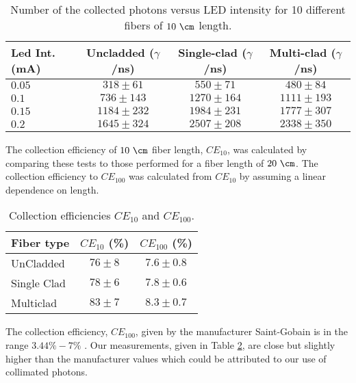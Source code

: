 \begin{table}[htbp]
\centering{}%
\begin{tabular}{lccc}
\toprule 
Led Int. (mA) & Uncladded ($\gamma$/ns) & Single-clad ($\gamma$/ns) & Multi-clad ($\gamma$/ns) \tabularnewline
\midrule
\midrule 
$0.05$ & $318 \pm 61$ & $550 \pm 71$ & $480 \pm 84$ \tabularnewline
$0.1$ & $736 \pm 143$ & $1270 \pm 164$ & $1111 \pm 193$ \tabularnewline
$0.15$ & $1184 \pm 232$ & $1984 \pm 231$ & $1777\pm 307$ \tabularnewline
$0.2$ & $1645 \pm 324$ & $2507 \pm 208$ & $2338 \pm 350$ \tabularnewline
\bottomrule
\end{tabular}
\caption{Number of the collected photons versus LED intensity for 10 different fibers of $10~\cm$ length.}
\label{tab:10DifferentSamplesAlltypes}
\end{table}
The collection efficiency of $10~\cm$ fiber length, $CE_{10}$, was calculated by comparing these tests to those performed for a fiber length of $20~\cm$. The collection efficiency  to $CE_{100}$ was calculated from $CE_{10}$ by assuming a linear dependence on length.

\begin{table}[htbp]
\centering{}%
\begin{tabular}{lcc}
\toprule 
Fiber type & $CE_{10}$ (\%) & $CE_{100}$ (\%) \tabularnewline
\midrule
\midrule 
UnCladded & $76 \pm 8$ & $7.6 \pm 0.8$ \tabularnewline
Single Clad & $78 \pm 6$ & $7.8 \pm 0.6$ \tabularnewline
Multiclad & $83 \pm 7$ & $8.3 \pm 0.7$ \tabularnewline
\bottomrule
\end{tabular}
\caption{Collection efficiencies $CE_{10}$ and $CE_{100}$.}
\label{tab:CollectionEfficiencyOfFibers}
\end{table}
The collection efficiency, $CE_{100}$, given by the manufacturer Saint-Gobain is in the range $3.44\%-7\%$ \cite{DataSheetBCF12Fiber}. Our measurements, given in Table \ref{tab:CollectionEfficiencyOfFibers}, are close but slightly higher than the manufacturer values which could be attributed to our use of collimated photons.

